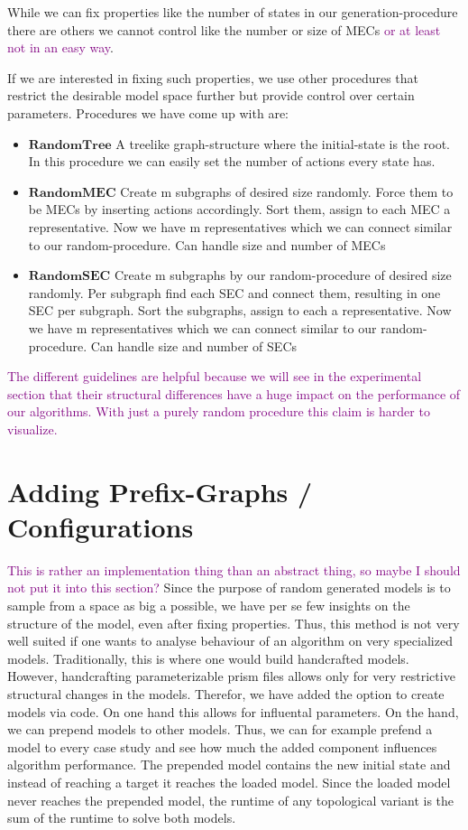 While we can fix properties like the number of states in our generation-procedure there are others we cannot control like the number or size of MECs \textcolor{purple}{or at least not in an easy way}.

If we are interested in fixing such properties, we use other procedures that restrict the desirable model space further but provide control over certain parameters. Procedures we have come up with are:
\begin{itemize}
\item $\textbf{RandomTree}$ A treelike graph-structure where the initial-state is the root. In this procedure we can easily set the number of actions every state has.
\item $\textbf{RandomMEC}$ Create m subgraphs of desired size randomly. Force them to be MECs by inserting actions accordingly. Sort them, assign to each MEC a representative. Now we have m representatives which we can connect similar to our random-procedure. Can handle size and number of MECs
\item $\textbf{RandomSEC}$ Create m subgraphs by our random-procedure of desired size randomly. Per subgraph find each SEC and connect them, resulting in one SEC per subgraph. Sort the subgraphs, assign to each a representative. Now we have m representatives which we can connect similar to our random-procedure. Can handle size and number of SECs
\end{itemize}

\textcolor{purple}{The different guidelines are helpful because we will see in the experimental section that their structural differences have a huge impact on the performance of our algorithms. With just a purely random procedure this claim is harder to visualize.}

\section{Adding Prefix-Graphs / Configurations}
\textcolor{purple}{This is rather an implementation thing than an abstract thing, so maybe I should not put it into this section?}
Since the purpose of random generated models is to sample from a space as big a possible, we have per se few insights on the structure of the model, 
even after fixing properties. Thus, this method is not very well suited if one wants to analyse behaviour of an algorithm on very specialized models. 
Traditionally, this is where one would build handcrafted models. 
However, handcrafting parameterizable prism files allows only for very restrictive structural changes in the models. 
Therefor, we have added the option to create models via code. On one hand this allows for influental parameters. On the hand, we can prepend models to 
other models. Thus, we can for example prefend a model to every case study and see how much the added component influences algorithm performance.
The prepended model contains the new initial state and instead of reaching a target it reaches the loaded model.
Since the loaded model never reaches the prepended model, the runtime of any topological variant is the sum of the runtime to solve both models.

